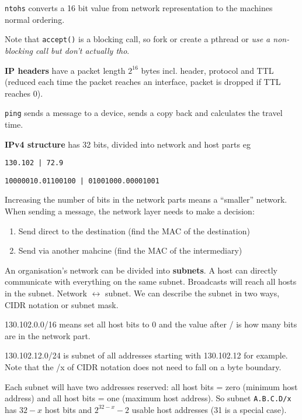 \documentclass[10pt, a4paper]{article}
\begin{document}
\begin{multicols}{4}
    \texttt{ntohs} converts a 16 bit value from network representation to the machines normal ordering.

    Note that \texttt{accept()} is a blocking call, so fork or create a pthread or \textit{use a non-blocking call but don't actually tho}.

    \textbf{IP headers} have a packet length $2^{16}$ bytes incl. header, protocol and TTL (reduced each time the packet reaches an interface, packet is dropped if TTL reaches 0).

    \texttt{ping} sends a message to a device, sends a copy back and calculates the travel time.

    \textbf{IPv4 structure} has 32 bits, divided into network and host parts eg
    \begin{center}
        \texttt{130.102 | 72.9}

        \texttt{10000010.01100100 | 01001000.00001001}
    \end{center}
    Increasing the number of bits in the network parts means a ``smaller'' network. When sending a message, the network layer needs to make a decision:
    \begin{enumerate}
        \item Send direct to the destination (find the MAC of the destination)
        \item Send via another mahcine (find the MAC of the intermediary)
    \end{enumerate}
    An organisation's network can be divided into \textbf{subnets}. A host can directly communicate with everything on the same subnet. Broadcasts will reach all hosts in the subnet. Network $\leftrightarrow$ subnet. We can describe the subnet in two ways, CIDR notation or subnet mask.
    
    130.102.0.0/16 means set all host bits to 0 and the value after / is how many bits are in the network part.
    
    130.102.12.0/24 is subnet of all addresses starting with 130.102.12 for example. Note that the /x of CIDR notation does not need to fall on a byte boundary.
    
    Each subnet will have two addresses reserved: all host bits = zero (minimum host address) and all host bits = one (maximum host address). So subnet \texttt{A.B.C.D/x} has $32-x$ host bits and $2^{32-x} - 2$ usable host addresses (31 is a special case).


\end{multicols}
\end{document}

